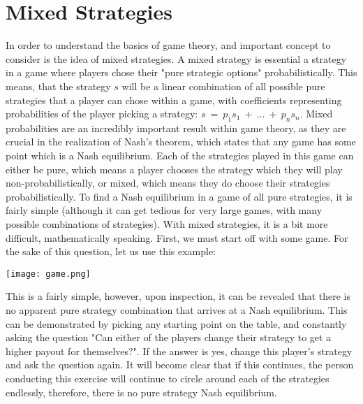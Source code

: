 \documentclass{article}
\begin{document}
\section{Mixed Strategies}
In order to understand the basics of game theory, and important concept to consider is the idea of mixed strategies. A mixed strategy is essential a strategy in a game where players chose their "pure strategic options" probabilistically. This means, that the strategy $s$ will be a linear combination of all possible pure strategies that a player can chose within a game, with coefficients representing probabilities of the player picking a strategy: $s \ = \ p_1s_1 \ + \ ... \ + \ p_ns_n$. Mixed probabilities are an incredibly important result within game theory, as they are crucial in the realization of Nash's theorem, which states that any game has some point which is a Nash equilibrium. Each of the strategies played in this game can either be pure, which means a player chooses the strategy which they will play non-probabilistically, or mixed, which means they do choose their strategies probabilistically.
\newline\newline
To find a Nash equilibrium in a game of all pure strategies, it is fairly simple (although it can get tedious for very large games, with many possible combinations of strategies). With mixed strategies, it is a bit more difficult, mathematically speaking. First, we must start off with some game. For the sake of this question, let us use this example:
\begin{center}
\texttt{[image: game.png]}
\end{center}
This is a fairly simple, however, upon inspection, it can be revealed that there is no apparent pure strategy combination that arrives at a Nash equilibrium. This can be demonstrated by picking any starting point on the table, and constantly asking the question "Can either of the players change their strategy to get a higher payout for themselves?". If the answer is yes, change this player's strategy and ask the question again. It will become clear that if this continues, the person conducting this exercise will continue to circle around each of the strategies endlessly, therefore, there is no pure strategy Nash equilibrium.
\newline\newline
\end{document}
